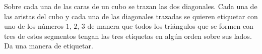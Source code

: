 Sobre cada una de las caras de un cubo se trazan las dos diagonales. Cada una de las aristas del cubo y cada una de las diagonales trazadas se quieren etiquetar con uno de los números $1$, $2$, $3$ de manera que todos los triángulos que se formen con tres de estos segmentos tengan las tres etiquetas en algún orden sobre sus lados. Da una manera de etiquetar.